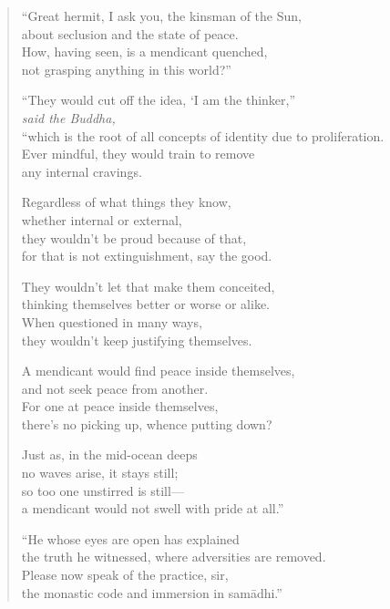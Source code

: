 \documentclass[12pt,openany]{book}%
\newcommand*{\scspeaker}[1]{\hspace{2em}\textit{#1}}
\begin{document}
\begin{verse}%
“Great hermit, I ask you, the kinsman of the Sun, \\
about seclusion and the state of peace. \\
How, having seen, is a mendicant quenched, \\
not grasping anything in this world?” 

“They would cut off the idea, ‘I am the thinker,” \\
\scspeaker{said the Buddha, }\\
“which is the root of all concepts of identity due to proliferation. \\
Ever mindful, they would train to remove \\
any internal cravings. 

Regardless of what things they know, \\
whether internal or external, \\
they wouldn’t be proud because of that, \\
for that is not extinguishment, say the good. 

They wouldn’t let that make them conceited, \\
thinking themselves better or worse or alike. \\
When questioned in many ways, \\
they wouldn’t keep justifying themselves. 

A mendicant would find peace inside themselves, \\
and not seek peace from another. \\
For one at peace inside themselves, \\
there’s no picking up, whence putting down? 

Just as, in the mid-ocean deeps \\
no waves arise, it stays still; \\
so too one unstirred is still—\\
a mendicant would not swell with pride at all.” 

“He whose eyes are open has explained \\
the truth he witnessed, where adversities are removed. \\
Please now speak of the practice, sir, \\
the monastic code and immersion in \textsanskrit{samādhi}.” 


\end{verse}
\end{document}
